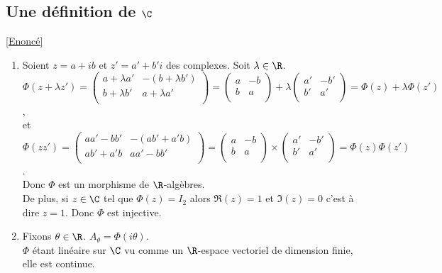 \documentclass[8pt]{book}
\begin{document}
	\subsection{Une définition de $\C$ }
	\label{Une définition de C corrigé}
	\textcolor{blue}{\hyperref[Une définition de C]{[Enoncé]}}\\
	\begin{enumerate}[leftmargin=*]
		\item Soient $z=a+ib$ et $z'=a'+b'i$ des complexes. Soit $\lambda\in \R$.\\
		$\Phi(z+\lambda z')=\begin{pmatrix}
			a+\lambda a'&-(b+\lambda b')\\
			b+\lambda b'&a+\lambda a'\\
		\end{pmatrix}=\begin{pmatrix}
			a&-b\\
			b&a\\
		\end{pmatrix}+\lambda\begin{pmatrix}
			a'&-b'\\
			b'&a'\\
		\end{pmatrix}=\Phi(z)+\lambda \Phi(z')$,\\
		et $\Phi(zz')=\begin{pmatrix}
			aa'-bb'&-(ab'+a'b)\\
			ab'+a'b&aa'-bb'\\
		\end{pmatrix}=\begin{pmatrix}
			a&-b\\
			b&a\\
		\end{pmatrix}\times\begin{pmatrix}
			a'&-b'\\
			b'&a'\\
		\end{pmatrix}=\Phi(z)\Phi(z')$.\\
		Donc $\Phi$ est un morphisme de $\R$-algèbres.\\
		De plus, si $z\in \C$ tel que $\Phi(z)=I_2$ alors $\Re(z)=1$ et $\Im(z)=0$ c'est à dire $z=1$. Donc $\Phi$ est injective.
		\item Fixons $\theta\in \R$. $A_\theta=\Phi(i\theta)$.\\
		$\Phi$ étant linéaire sur $\C$ vu comme un $\R$-espace vectoriel de dimension finie, elle est continue.\\

\end{enumerate}
\end{document}
